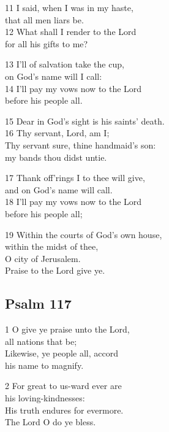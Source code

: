 11 I said, when I was in my haste,\\
that all men liars be.\\
12 What shall I render to the Lord\\
for all his gifts to me?

13 I’ll of salvation take the cup,\\
on God’s name will I call:\\
14 I’ll pay my vows now to the Lord\\
before his people all.

15 Dear in God’s sight is his saints’ death.\\
16 Thy servant, Lord, am I;\\
Thy servant sure, thine handmaid’s son:\\
my bands thou didst untie.

17 Thank off’rings I to thee will give,\\
and on God’s name will call.\\
18 I’ll pay my vows now to the Lord\\
before his people all;

19 Within the courts of God’s own house,\\
within the midst of thee,\\
O city of Jerusalem.\\
Praise to the Lord give ye.

\begin{center}
\quad{}\quad{}
\end{center}

\subsection*{Psalm 117}

1 O give ye praise unto the Lord,\\
all nations that be;\\
Likewise, ye people all, accord\\
his name to magnify.

2 For great to us-ward ever are\\
his loving-kindnesses:\\
His truth endures for evermore.\\
The Lord O do ye bless.

\begin{center}
\quad{}\quad{}
\end{center}

